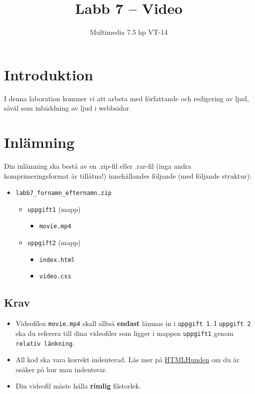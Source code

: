 \documentclass[12pt]{article}
\date{}
\title{ Labb 7 -- Video }
\author{ Multimedia 7.5 hp VT-14 }
\begin{document}
\maketitle
\vspace{-3.5em}




\section{Introduktion}
I denna laboration kommer vi att arbeta med författande och redigering av ljud, såväl som inbäddning av ljud i webbsidor.

\section{Inlämning}
Din inlämning ska bestå av en .zip-fil eller .rar-fil (inga andra komprimeringsformat är tillåtna!) innehållandes följande (med följande struktur):
  \begin{itemize}
    \item \texttt{labb7\_fornamn\_efternamn.zip}
      \vspace{-0.5em}
      \begin{itemize}
        \item \texttt{uppgift1} (mapp)
          \begin{itemize}
            \item \texttt{movie.mp4}
          \end{itemize}
        \item \texttt{uppgift2} (mapp)
          \begin{itemize}
            \item \texttt{index.html}
            \item \texttt{video.css}
          \end{itemize}
    \end{itemize}
  \end{itemize}

  \subsection{Krav}
  \begin{itemize}
    \item Videofilen \texttt{movie.mp4} skall alltså \textbf{endast} lämnas in i \texttt{uppgift 1}. I \texttt{uppgift 2} ska du referera till dina videofiler som ligger i mappen \texttt{uppgift1} genom \texttt{relativ länkning}.
    \item All kod ska vara korrekt indenterad. Läs mer på \href{http://htmlhunden.se}{HTMLHunden} om du är osäker på hur man indenterar.
    \item Din videofil måste hålla \textbf{rimlig} filstorlek.
  \end{itemize}
\end{document}
